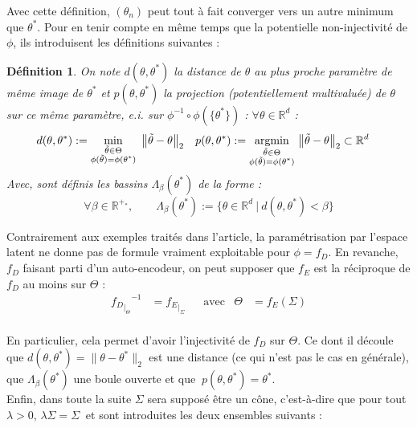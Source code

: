 \documentclass[hidelinks, french]{article} %
\newcommand{\R}{\mathbb{R}}
\newcommand{\argmin}[1]{\underset{#1}{\text{argmin}}}
\theoremstyle{enonce}
\newtheorem{definition}{Définition}
\theoremstyle{special}
\theoremstyle{rq}
\theoremstyle{exo}
\theoremstyle{demo}
\begin{document}
Avec cette définition, $(\theta_n)$ peut tout à fait converger vers un autre minimum que $\theta^*$. Pour en tenir compte en même temps que la potentielle non-injectivité de $\phi$, ils introduisent les définitions suivantes :
\\
\begin{definition}\label{def:boule}
On note $d(\theta,\theta^*)$ la distance de $\theta$ au plus proche paramètre de même image de $\theta^*$ et $p(\theta,\theta^*)$ la projection (potentiellement multivaluée) de $\theta$ sur ce même paramètre, e.i. sur $\phi^{-1}\circ\phi(\{\theta^*\})$ :
 $\forall\theta\in\R^d$ :
\begin{align*}d(\theta,\theta^*) &:=\min_{\substack{\Tilde{\theta}\in\Theta\\ \phi(\Tilde{\theta})=\phi(\theta^*)}}\ \big\|\Tilde{\theta}-\theta\big\|_2  &  p(\theta,\theta^*)&:=\argmin{\substack{\Tilde{\theta}\in\Theta\\ \phi(\Tilde{\theta})=\phi(\theta^*)}}\ \big\|\Tilde{\theta}-\theta\big\|_2\subset\R^d\end{align*}
Avec, sont définis les bassins $\Lambda_\beta(\theta^*)$ de la forme :
\[\forall \beta\in\R^{+_*},\qquad \Lambda_\beta(\theta^*):=\big\{\theta\in\R^d\ |\ d(\theta, \theta^*)<\beta\big\}\]
\end{definition}

Contrairement aux exemples traités dans l'article, la paramétrisation par l'espace latent ne donne pas de formule vraiment exploitable pour $\phi=f_D$. En revanche, $f_D$ faisant parti d'un auto-encodeur, on peut supposer que $f_E$ est la réciproque de $f_D$ au moins sur $\Theta$ :
\begin{align*} {{f_{D}}_{\displaystyle |_{\Theta}}}^{-1}&={f_{E}}_{\displaystyle |_{\Sigma}}  & &\text{avec} & \Theta&=f_E(\Sigma)
\end{align*}
\\
En particulier, cela permet d'avoir l'injectivité de $f_D$ sur $\Theta$. Ce dont il découle que $d(\theta,\theta^*)=\|\theta-\theta^*\|_2$ est une distance (ce qui n'est pas le cas en générale), que $\Lambda_\beta(\theta^*)$ une boule ouverte et que $\ p(\theta,\theta^*)=\theta^*$.
\\

Enfin, dans toute la suite $\Sigma$ sera supposé être un cône, c'est-à-dire que pour tout $\lambda>0$, $\lambda\Sigma=\Sigma\ $ et sont introduites les deux ensembles suivants :
\\
\end{document}
